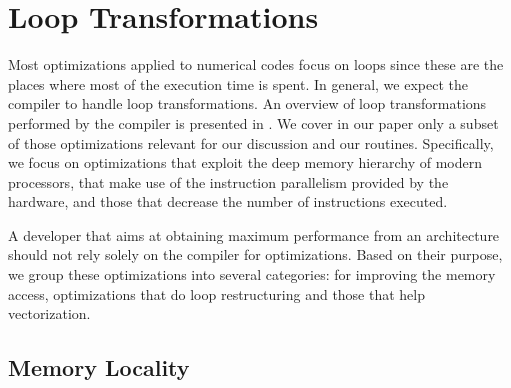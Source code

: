\section{Loop Transformations}
\label{sec:optimizations}

Most optimizations applied to numerical codes focus on loops since these are the
places where most of the execution time is spent. In general, we expect the
compiler to handle loop transformations. An overview of loop transformations
performed by the compiler is presented in \cite{Bacon:1994:CTH:197405.197406}.
We cover in our paper only a subset of those optimizations relevant for our
discussion and our routines. Specifically, we focus on optimizations that
exploit the deep memory hierarchy of modern processors, that make use of the
instruction parallelism provided by the hardware, and those that decrease the
number of instructions executed.

A developer that aims at obtaining maximum performance from an architecture
should not rely solely on the compiler for optimizations. Based on their
purpose, we group these optimizations into several categories: for improving the
memory access, optimizations that do loop restructuring and those that help
vectorization.

\subsection{Memory Locality}

